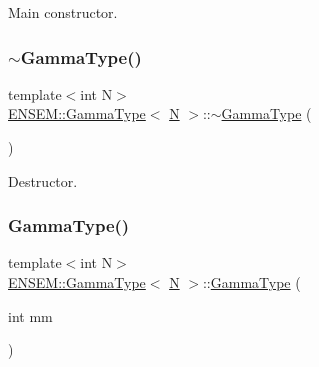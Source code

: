Main constructor. 

\mbox{\label{classENSEM_1_1GammaType_a2cc80e9a9f044b1b9b344f3419718a5e}} 
\subsubsection{\texorpdfstring{$\sim$GammaType()}{~GammaType()}\hspace{0.1cm}{\footnotesize\ttfamily [2/3]}}
{\footnotesize\ttfamily template$<$int N$>$ \\
\mbox{\hyperlink{classENSEM_1_1GammaType}{E\+N\+S\+E\+M\+::\+Gamma\+Type}}$<$ \mbox{\hyperlink{adat__devel_2lib_2hadron_2operator__name__util_8cc_a7722c8ecbb62d99aee7ce68b1752f337}{N}} $>$\+::$\sim$\mbox{\hyperlink{classENSEM_1_1GammaType}{Gamma\+Type}} (\begin{DoxyParamCaption}{ }\end{DoxyParamCaption})\hspace{0.3cm}{\ttfamily [inline]}}



Destructor. 

\mbox{\label{classENSEM_1_1GammaType_ab93a83aeee6b442968d78f30cb6b4a65}} 
\subsubsection{\texorpdfstring{GammaType()}{GammaType()}\hspace{0.1cm}{\footnotesize\ttfamily [4/6]}}
{\footnotesize\ttfamily template$<$int N$>$ \\
\mbox{\hyperlink{classENSEM_1_1GammaType}{E\+N\+S\+E\+M\+::\+Gamma\+Type}}$<$ \mbox{\hyperlink{adat__devel_2lib_2hadron_2operator__name__util_8cc_a7722c8ecbb62d99aee7ce68b1752f337}{N}} $>$\+::\mbox{\hyperlink{classENSEM_1_1GammaType}{Gamma\+Type}} (\begin{DoxyParamCaption}\item[{int}]{mm }\end{DoxyParamCaption})\hspace{0.3cm}{\ttfamily [inline]}}



